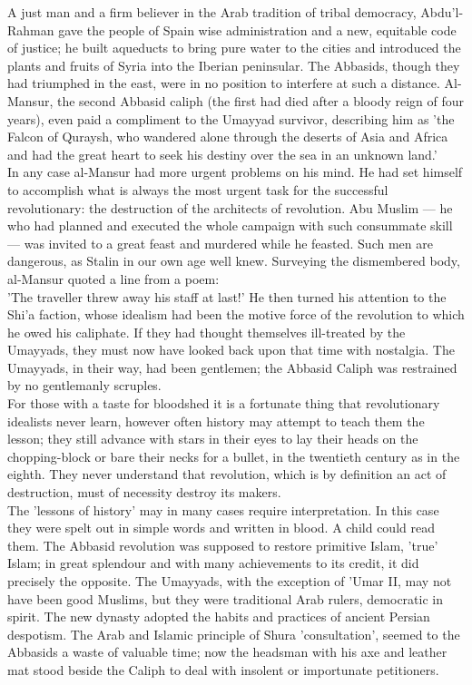 \documentclass[10pt, twoside,openright]{book}
\begin{document}
A just man and a firm believer in the Arab tradition of tribal democracy, Abdu'l\hyp{}Rahman gave the 
people of Spain wise administration and a new, equitable code of justice; he built aqueducts to bring 
pure water to the cities and introduced the plants and fruits of Syria into the Iberian peninsular. 
The Abbasids, though they had triumphed in the east, were in no position to interfere at such a 
distance. Al\hyp{}Mansur, the second Abbasid caliph (the first had died after a bloody reign of four 
years), even paid a compliment to the Umayyad survivor, describing him as 'the Falcon of Quraysh, who 
wandered alone through the deserts of Asia and Africa and had the great heart to seek his destiny 
over the sea in an unknown land.' \\

In any case al\hyp{}Mansur had more urgent problems on his mind. He had set himself to accomplish what is 
always the most urgent task for the successful revolutionary: the destruction of the architects of 
revolution. Abu Muslim --- he who had planned and executed the whole campaign with such consummate 
skill --- was invited to a great feast and murdered while he feasted. Such men are dangerous, as Stalin 
in our own age well knew. Surveying the dismembered body, al-Mansur quoted a line from a poem: \\

'The traveller threw away his staff at last!' He then turned his attention to the Shi'a faction, 
whose idealism had been the motive force of the revolution to which he owed his caliphate. If they 
had thought themselves ill\hyp{}treated by the Umayyads, they must now have looked back upon that time 
with nostalgia. The Umayyads, in their way, had been gentlemen; the Abbasid Caliph was restrained by 
no gentlemanly scruples. \\

For those with a taste for bloodshed it is a fortunate thing that revolutionary idealists never 
learn, however often history may attempt to teach them the lesson; they still advance with stars in 
their eyes to lay their heads on the chopping\hyp{}block or bare their necks for a bullet, in the 
twentieth century as in the eighth. They never understand that revolution, which is by definition an 
act of destruction, must of necessity destroy its makers. \\

The 'lessons of history' may in many cases require interpretation. In this case they were spelt out 
in simple words and written in blood. A child could read them. The Abbasid revolution was supposed to 
restore primitive Islam, 'true' Islam; in great splendour and with many achievements to its credit, 
it did precisely the opposite. The Umayyads, with the exception of 'Umar II, may not have been good 
Muslims, but they were traditional Arab rulers, democratic in spirit. The new dynasty adopted the 
habits and practices of ancient Persian despotism. The Arab and Islamic principle of Shura 
'consultation', seemed to the Abbasids a waste of valuable time; now the headsman with his axe and 
leather mat stood beside the Caliph to deal with insolent or importunate petitioners. \\
\end{document}
